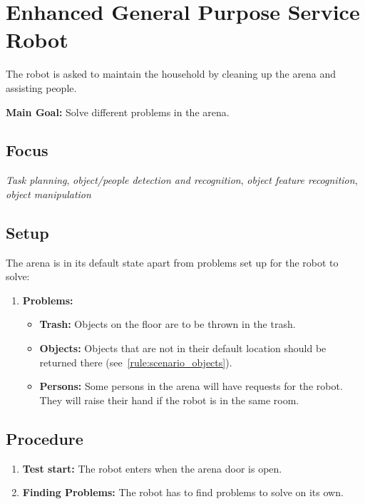 \section{Enhanced General Purpose Service Robot}\label{test:egpsr}
The robot is asked to maintain the household by cleaning up the arena and assisting people.


\noindent \textbf{Main Goal:} Solve different problems in the arena.\\


\subsection*{Focus}
\emph{Task planning}, \emph{object/people detection and recognition}, \emph{object feature recognition}, \emph{object manipulation}


\subsection*{Setup}
The arena is in its default state apart from problems set up for the robot to solve:
\begin{enumerate}
    \item \textbf{Problems:}
		\begin{itemize}
			\item \textbf{Trash:} Objects on the floor are to be thrown in the trash.
			\item \textbf{Objects:} Objects that are not in their default location should be returned there (see~\ref{rule:scenario_objects}). 
			\item \textbf{Persons:} Some persons in the arena will have requests for the robot. They will raise their hand if the robot is in the same room.
		\end{itemize}
\end{enumerate}


\subsection*{Procedure}
\begin{enumerate}[nosep]
	\item \textbf{Test start:} The robot enters when the arena door is open.
	\item \textbf{Finding Problems:} The robot has to find problems to solve on its own.
\end{enumerate}


